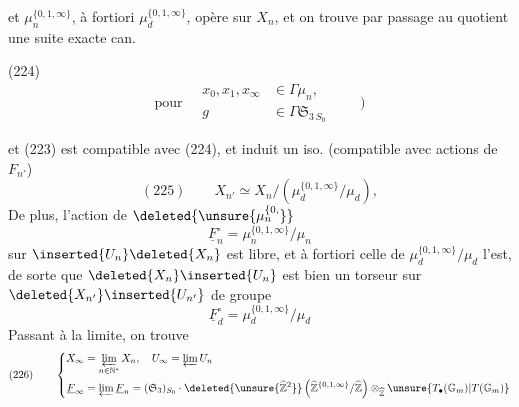 

et $\mu_n^{\{0,1,\infty\}}$, à fortiori $\mu_d^{\{0,1,\infty\}}$, opère  sur $X_n$, et on trouve par passage au quotient  une suite exacte can.

\noindent (224)\quad
{}
\[
\text{pour}\quad\begin{aligned}x_0,x_1,x_{\infty}&\in\Gamma\mu_n,\\g&\in\Gamma\mathfrak S_{3\,S_0}\end{aligned}\qquad\big)
\]

et  (223) est compatible avec (224), et induit un iso. (compatible avec actions de $F_{n'}$)
\[
(225)\qquad X_{n'}\simeq X_n/(\mu_d^{\{0,1,\infty\}}/\mu_d),
\]
De plus, l'action de $\deleted{\unsure{\mu_n^{\{0,}}}$
\[
\underline F_n^{\circ}=\mu_n^{\{0,1,\infty\}}/\mu_n
\]
sur $\inserted{U_n}\deleted{X_n}$ est libre, et à fortiori celle de $\mu_d^{\{0,1,\infty\}}/\mu_d$ l'est, de sorte que $\deleted{X_n}\inserted{U_n}$ est bien un torseur sur $\deleted{X_{n'}}\inserted{U_{n'}}$ de groupe
\[
\underline F_d^{\circ}=\mu_d^{\{0,1,\infty\}}/\mu_d
\]
Passant à la limite, on trouve
\[
(226)\qquad\left\{\begin{aligned}
X_{\infty}&=\varprojlim_{n\in\mathbb N^{*}}X_n,\quad U_{\infty}=\varprojlim U_n\\
\underline F_{\infty}&=\varprojlim\underline F_n=(\mathfrak S_3)_{S_0}\mathbin{\cdot}\deleted{\unsure{\widehat{\mathbb Z}^{2}}}\left(\widehat{\mathbb Z}^{\{0,1,\infty\}}/\widehat{\mathbb Z}\right)\otimes_{\widehat{\mathbb Z}}\unsure{T_{\bullet}(\mathbb G_m)|T(\mathbb G_m)}
\end{aligned}\right.
\]


